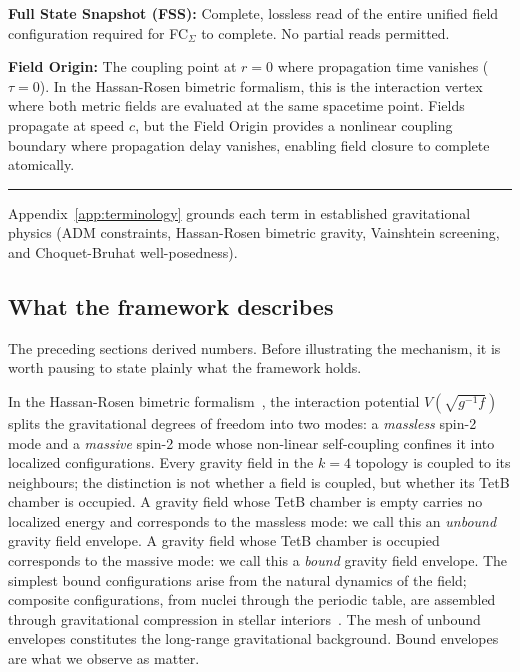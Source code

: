 \documentclass[aps,prd,preprint,superscriptaddress,showpacs,preprintnumbers,amsmath,amssymb,nofootinbib]{revtex4-2}
\begin{document}
\smallskip

\noindent\textbf{Full State Snapshot (FSS):} Complete, lossless read of the entire unified field configuration required for FC$_{\Sigma}$ to complete. No partial reads permitted.

\smallskip

\noindent\textbf{Field Origin:} The coupling point at $r = 0$ where propagation time vanishes ($\tau = 0$). In the Hassan-Rosen bimetric formalism, this is the interaction vertex where both metric fields are evaluated at the same spacetime point. Fields propagate at speed $c$, but the Field Origin provides a nonlinear coupling boundary where propagation delay vanishes, enabling field closure to complete atomically.

\noindent\rule{\textwidth}{0.4pt}

{\small Appendix~\ref{app:terminology} grounds each term in established gravitational physics (ADM constraints, Hassan-Rosen bimetric gravity, Vainshtein screening, and Choquet-Bruhat well-posedness).}

\subsection{What the framework describes}
\label{subsec:whatwehold}

The preceding sections derived numbers. Before illustrating the mechanism, it is worth pausing to state plainly what the framework holds.

In the Hassan-Rosen bimetric formalism~\cite{hassan2012}, the interaction potential $V(\sqrt{g^{-1}f})$ splits the gravitational degrees of freedom into two modes: a \emph{massless} spin-2 mode and a \emph{massive} spin-2 mode whose non-linear self-coupling confines it into localized configurations. Every gravity field in the $k = 4$ topology is coupled to its neighbours; the distinction is not whether a field is coupled, but whether its TetB chamber is occupied. A gravity field whose TetB chamber is empty carries no localized energy and corresponds to the massless mode: we call this an \emph{unbound} gravity field envelope. A gravity field whose TetB chamber is occupied corresponds to the massive mode: we call this a \emph{bound} gravity field envelope. The simplest bound configurations arise from the natural dynamics of the field; composite configurations, from nuclei through the periodic table, are assembled through gravitational compression in stellar interiors~\cite{burbidge1957}. The mesh of unbound envelopes constitutes the long-range gravitational background. Bound envelopes are what we observe as matter.
\end{document}
